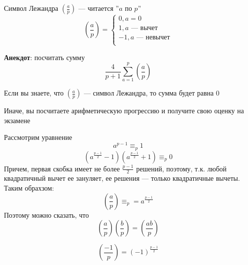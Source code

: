 \begin{definition}
    Символ Лежандра \(\left(\frac{a}{p}\right)\) --- читается ''\(a\) по \(p\)''
    \[
    \left(\frac{a}{p}\right) = \left\{\begin{array}{l}
        0, a = 0 \\
        1, a\text{ --- вычет} \\
        -1, a\text{ --- невычет} \\
    \end{array}\right.
    \]
\end{definition}

\textbf{Анекдот}: посчитать сумму 
\[\frac{4}{p + 1}\sum_{a = 1}^p\left(\frac{a}{p}\right)\]
\begin{solution}[1]
    Если вы знаете, что \(\left(\frac{a}{p}\right)\) --- символ Лежандра, то сумма будет равна 0
\end{solution}
\begin{solution}[2]
    Иначе, вы посчитаете арифметическую прогрессию и получите свою оценку на экзамене
\end{solution}

Рассмотрим уравнение
\[a^{p-1} \equiv_p 1\]
\[\left(a^{\frac{p-1}{2}} - 1\right)\left(a^{\frac{p-1}{2}} + 1\right)  \equiv_p 0\]
Причем, первая скобка имеет не более \(\frac{p-1}{2}\) решений, поэтому, т.к. любой квадратичный вычет ее зануляет, ее решения --- только квадратичные вычеты. Таким обрахзом:
\[\left(\frac{a}{p}\right) \equiv_p = a^{\frac{p-1}{2}}\]
Поэтому можно сказать, что 
\[\left(\frac{a}{p}\right)\left(\frac{b}{p}\right) = \left(\frac{ab}{p}\right)\]
\begin{note}
    \[\left(\frac{-1}{p}\right) = (-1)^\frac{p-1}{2}\]
\end{note}

